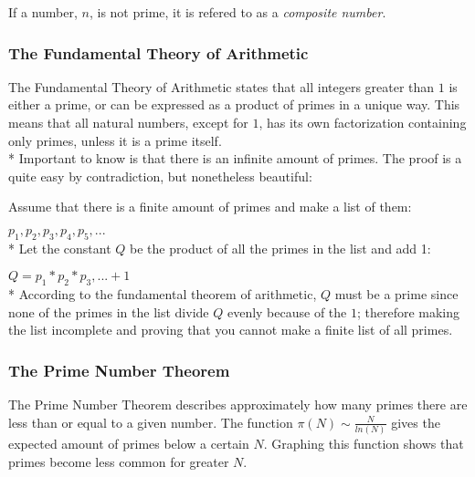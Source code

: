 \documentclass[main.tex]{subfiles}
\begin{document}
If a number, $n$, is not prime, it is refered to as a \textit{composite number}.

\subsubsection{The Fundamental Theory of Arithmetic}
The Fundamental Theory of Arithmetic \cite{theorem:arithmetic} states that all integers greater than $1$ is either a prime, or can be expressed as a product of primes in a unique way. This means that all natural numbers, except for $1$, has its own factorization containing only primes, unless it is a prime itself.
\newline
\\*
Important to know is that there is an infinite amount of primes. The proof is a quite easy by contradiction, but nonetheless beautiful:

\begin{mdframed}
    Assume that there is a finite amount of primes and make a list of them:

    $p_1, p_2, p_3, p_4, p_5, ...$ 
    \newline
    \\*
    Let the constant $Q$ be the product of all the primes in the list and add 1:

    $Q = p_1 * p_2 * p_3, ... + 1$
    \newline
    \\*
    According to the fundamental theorem of arithmetic, $Q$ must be a prime since none of the primes in the list divide $Q$ evenly because of the $1$; therefore making the list incomplete and proving that you cannot make a finite list of all primes. 
\end{mdframed}

\subsubsection{The Prime Number Theorem}
The Prime Number Theorem \cite{theorem:prime_num} describes approximately how many primes there are less than or equal to a given number. The function $\pi(N) \sim \frac{N}{ln(N)}$ gives the expected amount of primes below a certain $N$. Graphing this function shows that primes become less common for greater $N$.

\begin{center}
\end{center}
\end{document}
